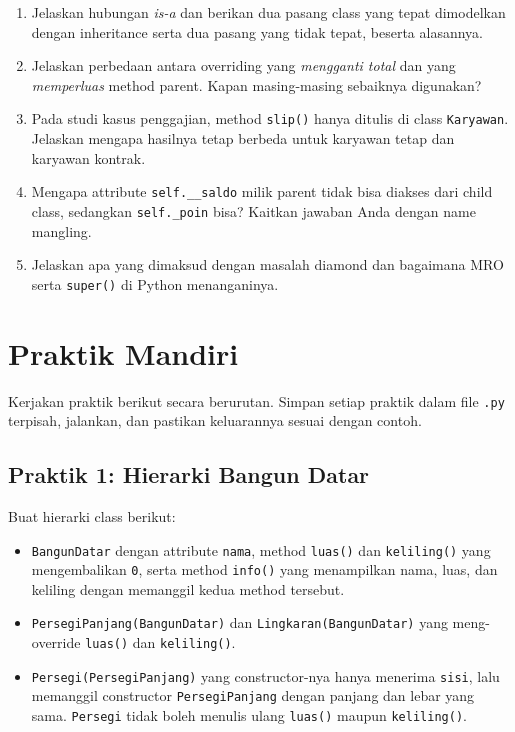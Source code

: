 \begin{enumerate}
  \item Jelaskan hubungan \emph{is-a} dan berikan dua pasang class yang tepat dimodelkan dengan inheritance serta dua pasang yang tidak tepat, beserta alasannya.
  \item Jelaskan perbedaan antara overriding yang \emph{mengganti total} dan yang \emph{memperluas} method parent. Kapan masing-masing sebaiknya digunakan?
  \item Pada studi kasus penggajian, method \texttt{slip()} hanya ditulis di class \texttt{Karyawan}. Jelaskan mengapa hasilnya tetap berbeda untuk karyawan tetap dan karyawan kontrak.
  \item Mengapa attribute \texttt{self.\_\_saldo} milik parent tidak bisa diakses dari child class, sedangkan \texttt{self.\_poin} bisa? Kaitkan jawaban Anda dengan name mangling.
  \item Jelaskan apa yang dimaksud dengan masalah diamond dan bagaimana MRO serta \texttt{super()} di Python menanganinya.
\end{enumerate}

\section{Praktik Mandiri}

Kerjakan praktik berikut secara berurutan. Simpan setiap praktik dalam file \texttt{.py} terpisah, jalankan, dan pastikan keluarannya sesuai dengan contoh.

\subsection{Praktik 1: Hierarki Bangun Datar}

Buat hierarki class berikut:

\begin{itemize}
  \item \texttt{BangunDatar} dengan attribute \texttt{nama}, method \texttt{luas()} dan \texttt{keliling()} yang mengembalikan \texttt{0}, serta method \texttt{info()} yang menampilkan nama, luas, dan keliling dengan memanggil kedua method tersebut.
  \item \texttt{PersegiPanjang(BangunDatar)} dan \texttt{Lingkaran(BangunDatar)} yang meng-override \texttt{luas()} dan \texttt{keliling()}.
  \item \texttt{Persegi(PersegiPanjang)} yang constructor-nya hanya menerima \texttt{sisi}, lalu memanggil constructor \texttt{PersegiPanjang} dengan panjang dan lebar yang sama. \texttt{Persegi} tidak boleh menulis ulang \texttt{luas()} maupun \texttt{keliling()}.
\end{itemize}

